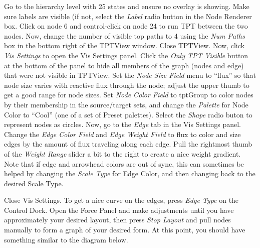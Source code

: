 \documentclass[10pt,a4paper]{report}
\begin{document}
Go to the hierarchy level with 25 states and ensure no overlay is showing. Make sure labels are visible (if not, select the \emph{Label} radio button in the Node Renderer box. Click on node 6 and control-click on node 24 to run TPT between the two nodes. Now, change the number of visible top paths to 4 using the \emph{Num Paths} box in the bottom right of the TPTView window. Close TPTView. Now, click \emph{Vis Settings} to open the Vis Settings panel. Click the \emph{Only TPT Visible} button at the bottom of the panel to hide all members of the graph (nodes and edge) that were not visible in TPTView. Set the \emph{Node Size Field} menu to ``flux'' so that node size varies with reactive flux through the node; adjust the upper thumb to get a good range for node sizes. Set \emph{Node Color Field} to tptGroup to color nodes by their membership in the source/target sets, and change the \emph{Palette} for Node Color to ``Cool'' (one of a set of Preset palettes). Select the \emph{Shape} radio buton to represent nodes as circles. Now, go to the \emph{Edge} tab in the Vis Settings panel. Change the \emph{Edge Color Field} and \emph{Edge Weight Field} to flux to color and size edges by the amount of flux traveling along each edge. Pull the rightmost thumb of the \emph{Weight Range} slider a bit to the right to create a nice weight gradient. Note that if edge and arrowhead colors are out of sync, this can sometimes be helped by changing the \emph{Scale Type} for Edge Color, and then changing back to the desired Scale Type. 

Close Vis Settings. To get a nice curve on the edges, press \emph{Edge Type} on the Control Dock. Open the Force Panel and make adjustments until you have approximately your desired layout, then press \emph{Stop Layout} and pull nodes manually to form a graph of your desired form. At this point, you should have something similar to the diagram below. 
\end{document}
